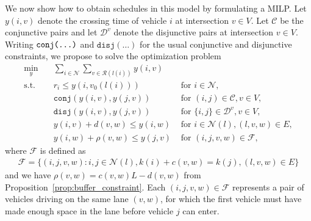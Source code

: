 \documentclass{article}
\theoremstyle{definition}
\theoremstyle{plain}
\newtheorem{proposition}{Proposition}
\begin{document}
We now show how to obtain schedules in this model by formulating a MILP. Let
$y(i,v)$ denote the crossing time of vehicle $i$ at intersection $v \in V$. Let
$\mathcal{C}$ be the conjunctive pairs and let $\mathcal{D}^{v}$ denote the
disjunctive pairs at intersection $v \in V$.
%
Writing $\texttt{conj(\dots)}$ and $\texttt{disj}(\dots)$ for the usual conjunctive and disjunctive
constraints, we propose to solve the optimization problem
\begin{subequations}\label{eq:network_problem}
\begin{align}
  \min_{y} \quad & \sum_{i \in \mathcal{N}} \sum_{v \in \mathcal{R}(l(i))} y(i,v) & \\
  \text{s.t.} \quad & r_{i} \leq y(i, v_{0}(l(i))) & \text{ for } i \in \mathcal{N} , \\
  & \texttt{conj}(y(i,v), y(j,v)) & \text{ for } (i,j) \in \mathcal{C}, v \in V , \\
  & \texttt{disj}(y(i,v), y(j,v)) & \text{ for } \{i,j\} \in \mathcal{D}^{v}, v \in V , \\
  & y(i, v) + d(v, w) \leq y(i, w) & \text{ for } i \in \mathcal{N}(l), (l, v, w) \in E, \label{eq:travel_delay} \\
  & y(i, w) + \rho(v, w) \leq y(j, v) & \text{ for } (i,j,v,w) \in \mathcal{F} , \label{eq:buffer_constraints}
\end{align}
\end{subequations}
where $\mathcal{F}$ is defined as
\begin{align*}
  \mathcal{F} = \{ (i,j,v,w) : i,j \in \mathcal{N}(l), k(i) + c(v,w) = k(j),  (l,v,w) \in E\}
\end{align*}
and we have $\rho(v, w) = c(v, w) L - d(v, w)$ from Proposition~\ref{prop:buffer_constraint}. Each
$(i,j,v,w) \in \mathcal{F}$ represents a pair of vehicles driving on the same lane
$(v,w)$, for which the first vehicle must have made enough space in the lane
before vehicle $j$ can enter.
%
%
%
\end{document}

